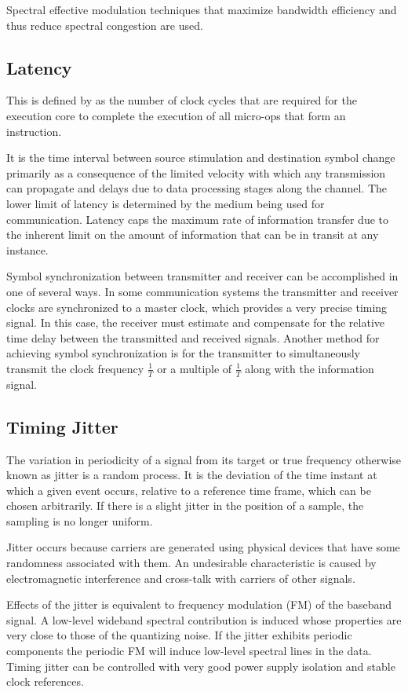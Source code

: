 Spectral effective modulation techniques that maximize bandwidth efficiency and thus reduce spectral
congestion are used.\cite{AWGN}

\subsection{Latency}
This is defined by \cite{latintel} as the number of clock cycles that are required for the execution core to complete the execution of all micro-ops that form an instruction.

It is the time interval between source stimulation and destination \gls{symbol} change primarily as a consequence of the limited velocity with which any transmission can propagate and delays due to data processing stages along the channel.
The lower limit of latency is determined by the medium being used for communication. Latency caps the maximum rate of information transfer due to the inherent limit on the amount of information that can be in transit at any instance. 

Symbol synchronization between transmitter and receiver can be accomplished in one of several ways. In some
communication systems the transmitter and receiver clocks are synchronized to a master clock, which
provides a very precise timing signal. In this case, the receiver must estimate and compensate for the
relative time delay between the transmitted and received signals. Another method for achieving \gls{symbol}
synchronization is for the transmitter to simultaneously transmit the clock frequency $\frac{1}{T}$ or a multiple of $\frac{1}{T}$ along with the information signal.\cite{Salehi}

\subsection{Timing Jitter}
The variation in periodicity of a signal from its target or true frequency otherwise known as jitter is a
random process. It is the deviation of the time instant at which a given event occurs, relative to a reference time frame, which can be chosen arbitrarily\cite{jitter}.  If there is a slight jitter in
 the position of a sample, the sampling is no longer uniform.

 Jitter occurs because carriers are generated using physical devices that have some randomness associated with them. An undesirable characteristic  is caused by electromagnetic interference and cross-talk with carriers of other signals.
 
Effects of the jitter is equivalent to frequency modulation (FM) of the baseband signal. A low-level wideband spectral contribution is induced whose properties are very close to those of the quantizing noise. If the  jitter exhibits periodic components the periodic FM will induce low-level spectral lines in the data. Timing jitter can be controlled with very good power supply isolation and stable clock references.\cite{AWGN}
 
